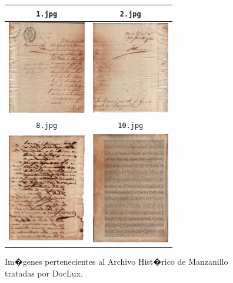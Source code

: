 \documentclass{rcci} %
\begin{document}
\begin{figure}[H]
\begin{center}
\begin{tabular}{|c|c|}\hline
\verb+1.jpg+
&\verb+2.jpg+\\\hline
\includegraphics[width=3.4cm]{1}
&\includegraphics[width=3.4cm]{2}\\\hline
\verb+8.jpg+
&\verb+10.jpg+\\\hline
\includegraphics[width=3.4cm]{8}
&\includegraphics[width=3.4cm]{10}\\\hline
\end{tabular}
\end{center}
\caption{Im�genes pertenecientes al Archivo Hist�rico de Manzanillo tratadas por DocLux.}
\label{img_of_AHM}
\end{figure}
\end{document}
